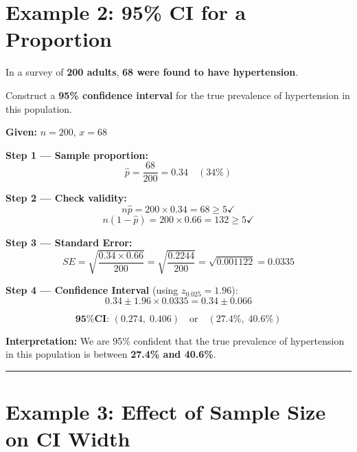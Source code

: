 \documentclass[
  12pt,
  letterpaper,
]{book}
\begin{document}
\section{Example 2: 95\% CI for a
Proportion}\label{example-2-95-ci-for-a-proportion}

In a survey of \textbf{200 adults}, \textbf{68 were found to have
hypertension}.

Construct a \textbf{95\% confidence interval} for the true prevalence of
hypertension in this population.

\begin{tcolorbox}[enhanced jigsaw, arc=.35mm, bottomrule=.15mm, bottomtitle=1mm, breakable, colback=white, colbacktitle=quarto-callout-tip-color!10!white, colframe=quarto-callout-tip-color-frame, coltitle=black, left=2mm, leftrule=.75mm, opacityback=0, opacitybacktitle=0.6, rightrule=.15mm, title={✅ Solution}, titlerule=0mm, toprule=.15mm, toptitle=1mm]

\textbf{Given:} \(n = 200\), \(x = 68\)

\textbf{Step 1 --- Sample proportion:}
\[\hat{p} = \frac{68}{200} = 0.34 \quad (34\%)\]

\textbf{Step 2 --- Check validity:}
\[n\hat{p} = 200 \times 0.34 = 68 \geq 5 \checkmark\]
\[n(1-\hat{p}) = 200 \times 0.66 = 132 \geq 5 \checkmark\]

\textbf{Step 3 --- Standard Error:}
\[SE = \sqrt{\frac{0.34 \times 0.66}{200}} = \sqrt{\frac{0.2244}{200}} = \sqrt{0.001122} = 0.0335\]

\textbf{Step 4 --- Confidence Interval} (using \(z_{0.025} = 1.96\)):
\[0.34 \pm 1.96 \times 0.0335 = 0.34 \pm 0.066\]

\[\textbf{95\% CI: } (0.274, \; 0.406) \quad \text{or} \quad (27.4\%, \; 40.6\%)\]

\textbf{Interpretation:} We are 95\% confident that the true prevalence
of hypertension in this population is between \textbf{27.4\% and
40.6\%}.

\end{tcolorbox}

\begin{center}\rule{0.5\linewidth}{0.5pt}\end{center}

\section{Example 3: Effect of Sample Size on CI
Width}\label{example-3-effect-of-sample-size-on-ci-width}
\end{document}
